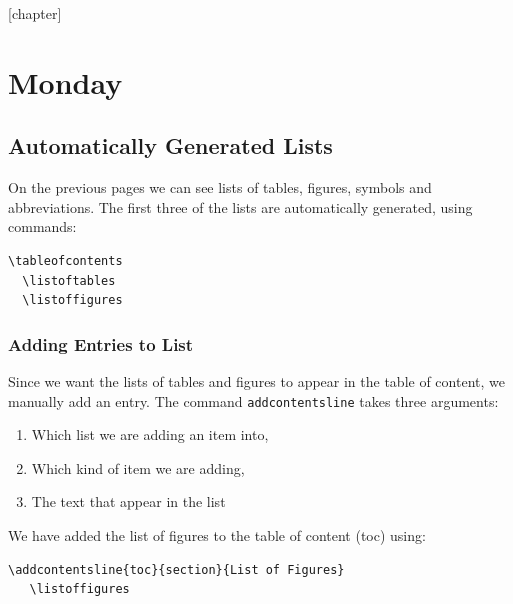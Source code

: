 \documentclass[a4paper,10pt]{report} %
\begin{document}
\setcounter{chapter}{1}
\setcounter{figure}{1} 

\newpage 

\setcounter{chapter}{2}
[chapter]
\chapter{Monday} 

\section{Automatically Generated Lists}\label{sec:automatic}
On the previous pages we can see lists of tables, figures, symbols and abbreviations. The first three of the lists are automatically generated, using commands:

\begin{lstlisting}[language={[latex]tex},
  frame=single,
  basicstyle=\footnotesize\color{darkgray}, 
  keywordstyle=\bf\color{magenta},
  commentstyle=\color{ForestGreen},  %
  breaklines=true
  ]
  \tableofcontents
  \listoftables
  \listoffigures
\end{lstlisting}

\subsection{Adding Entries to List}
 Since we want the lists of tables and figures to appear in the table of content, we manually add an entry. The command \texttt{addcontentsline} takes three arguments:
 \begin{enumerate}[label=\arabic*)]
  \item Which list we are adding an item into,
  \item Which kind of item we are adding,
  \item The text that appear in the list
 \end{enumerate}

 We have added the list of figures to the table of content (toc) using: 
 \begin{lstlisting}[language={[latex]tex},
   frame=single,
   basicstyle=\footnotesize\color{darkgray}, 
   keywordstyle=\bf\color{magenta},
   commentstyle=\color{ForestGreen},  %
   breaklines=true
   ]
   \addcontentsline{toc}{section}{List of Figures} 
   \listoffigures
\end{lstlisting}
\end{document}
